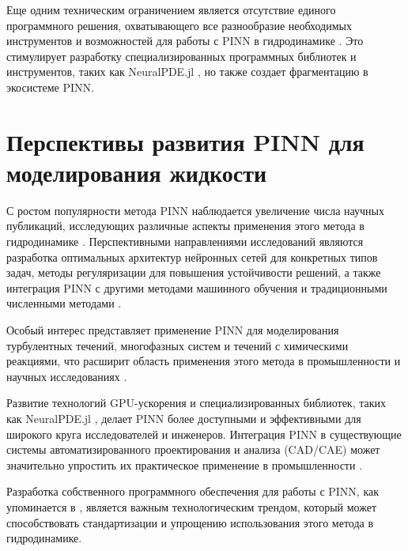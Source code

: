 Еще одним техническим ограничением является отсутствие единого программного решения, охватывающего все разнообразие
необходимых инструментов и возможностей для работы с PINN в гидродинамике \cite{cuomo2022scientific}. Это стимулирует
разработку специализированных программных библиотек и инструментов, таких как NeuralPDE.jl \cite{neuralpde2023}, но также
создает фрагментацию в экосистеме PINN.

\section{Перспективы развития PINN для моделирования жидкости}
С ростом популярности метода PINN наблюдается увеличение числа научных публикаций, исследующих различные аспекты применения
этого метода в гидродинамике \cite{karniadakis2021physics}. Перспективными направлениями исследований являются разработка
оптимальных архитектур нейронных сетей для конкретных типов задач, методы регуляризации для повышения устойчивости решений,
а также интеграция PINN с другими методами машинного обучения и традиционными численными методами \cite{jagtap2022physics}.

Особый интерес представляет применение PINN для моделирования турбулентных течений, многофазных систем и течений с химическими
реакциями, что расширит область применения этого метода в промышленности и научных исследованиях \cite{sun2020surrogate}.

Развитие технологий GPU-ускорения и специализированных библиотек, таких как NeuralPDE.jl \cite{neuralpde2023}, делает PINN
более доступными и эффективными для широкого круга исследователей и инженеров. Интеграция PINN в существующие системы
автоматизированного проектирования и анализа (CAD/CAE) может значительно упростить их практическое применение в
промышленности \cite{cuomo2022scientific}.

Разработка собственного программного обеспечения для работы с PINN, как упоминается в \cite{lu2021deepxde}, является важным
технологическим трендом, который может способствовать стандартизации и упрощению использования этого метода в гидродинамике.
